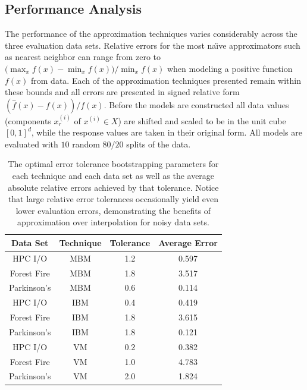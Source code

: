 \documentclass[smallextended]{svjour3}       %
\begin{document}
\subsection{Performance Analysis}
\label{sec_performance_analysis}

The performance of the approximation techniques varies considerably across the three evaluation data sets. Relative errors for the most na\"{\i}ve approximators such as nearest neighbor can range from zero to $\displaystyle \big(\max_x f(x) - \min_x f(x)\big) / \min_x f(x)$ when modeling a positive function $f(x)$ from data. Each of the approximation techniques presented remain within these bounds and all errors are presented in signed relative form $(\hat f(x) - f(x)) / f(x)$. Before the models are constructed all data values (components $x^{(i)}_r$ of $x^{(i)} \in X$) are shifted and scaled to be in the unit cube $[0,1]^d$, while the response values are taken in their original form. All models are evaluated with $10$ random $80/20$ splits of the data.

\begin{table}
  \centering
  \begin{tabular}{c|c|c|c}
    \hline
    \textbf{Data Set} & \textbf{Technique} & \textbf{Tolerance} & \textbf{Average Error}\\
    \hline
    HPC I/O & MBM & 1.2 & 0.597\\
    Forest Fire & MBM & 1.8 & 3.517\\
    Parkinson's & MBM & 0.6 & 0.114\\
    \hline
    HPC I/O & IBM & 0.4 & 0.419\\
    Forest Fire & IBM & 1.8 & 3.615\\
    Parkinson's & IBM & 1.8 & 0.121\\
    \hline
    HPC I/O & VM & 0.2 & 0.382\\
    Forest Fire & VM & 1.0 & 4.783\\
    Parkinson's & VM & 2.0 & 1.824\\
    \hline
  \end{tabular}
  \caption{The optimal error tolerance bootstrapping parameters for each technique and each data set as well as the average absolute relative errors achieved by that tolerance. Notice that large relative error tolerances occasionally yield even lower evaluation errors, demonstrating the benefits of approximation over interpolation for noisy data sets.
  \vspace{-.5cm}}
  \label{tab_optimal_tolerance}
\end{table}
\end{document}
